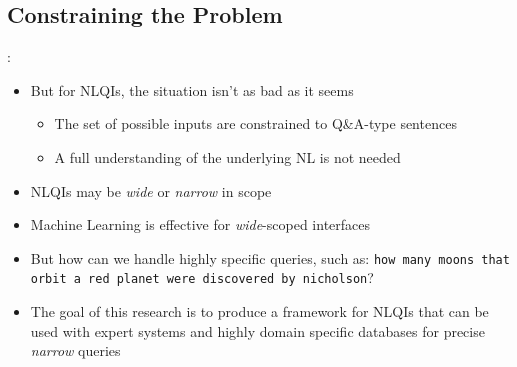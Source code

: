 \documentclass[logoontitle,tabu,supertabular,aspectratio=43]{preney-uwindsor-beamer}
\begin{document}
    \subsection{Constraining the Problem}
    \begin{frame}{\insertsection: \insertsubsection}
        \begin{itemize}
            \item But for NLQIs, the situation isn't as bad as it seems
            \begin{itemize}
            \item The set of possible inputs are constrained to Q\&A-type sentences
            \item A full understanding of the underlying NL is not needed
            \end{itemize}
            \item NLQIs may be {\em wide} or {\em narrow} in scope
            \item Machine Learning is effective for {\em wide}-scoped interfaces
            \item But how can we handle highly specific queries, such as: \texttt{how many moons that orbit a red planet were discovered by nicholson}?
            \item The goal of this research is to produce a framework for NLQIs that can be used with expert systems and highly domain specific databases for precise {\em narrow} queries
        \end{itemize}
    \end{frame}

\end{document}
